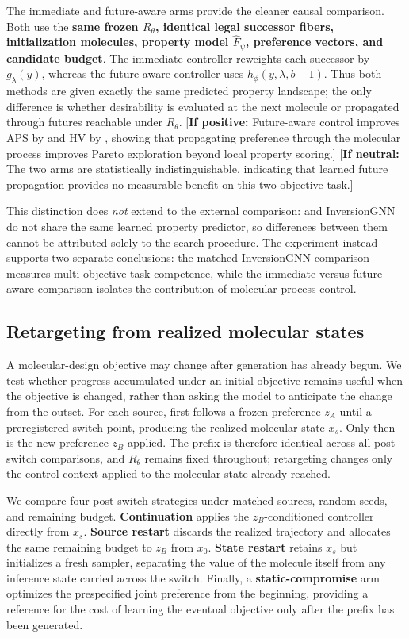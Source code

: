 The immediate and future-aware \method{} arms provide the cleaner causal comparison. Both use the \textbf{same frozen $R_\theta$, identical legal successor fibers, initialization molecules, property model $\widehat F_\psi$, preference vectors, and candidate budget}. The immediate controller reweights each successor by $g_\lambda(y)$, whereas the future-aware controller uses $h_\phi(y,\lambda,b-1)$. Thus both methods are given exactly the same predicted property landscape; the only difference is whether desirability is evaluated at the next molecule or propagated through futures reachable under $R_\theta$. {\color{red}[\textbf{If positive:} Future-aware control improves APS by \textbf{\XXX{}} and HV by \textbf{\XXX{}}, showing that propagating preference through the molecular process improves Pareto exploration beyond local property scoring.] [\textbf{If neutral:} The two arms are statistically indistinguishable, indicating that learned future propagation provides no measurable benefit on this two-objective task.]}

This distinction does \emph{not} extend to the external comparison: \method{} and InversionGNN do not share the same learned property predictor, so differences between them cannot be attributed solely to the search procedure. The experiment instead supports two separate conclusions: the matched InversionGNN comparison measures multi-objective task competence, while the immediate-versus-future-aware \method{} comparison isolates the contribution of molecular-process control.

\subsection{Retargeting from realized molecular states}
\label{sec:exp-retarget}

A molecular-design objective may change after generation has already begun. We test whether progress accumulated under an initial objective remains useful when the objective is changed, rather than asking the model to anticipate the change from the outset. For each source, \method{} first follows a frozen preference $z_A$ until a preregistered switch point, producing the realized molecular state $x_s$. Only then is the new preference $z_B$ applied. The prefix is therefore identical across all post-switch comparisons, and $R_\theta$ remains fixed throughout; retargeting changes only the control context applied to the molecular state already reached.

We compare four post-switch strategies under matched sources, random seeds, and remaining budget. \textbf{Continuation} applies the $z_B$-conditioned controller directly from $x_s$. \textbf{Source restart} discards the realized trajectory and allocates the same remaining budget to $z_B$ from $x_0$. \textbf{State restart} retains $x_s$ but initializes a fresh sampler, separating the value of the molecule itself from any inference state carried across the switch. Finally, a \textbf{static-compromise} arm optimizes the prespecified joint preference from the beginning, providing a reference for the cost of learning the eventual objective only after the prefix has been generated.

